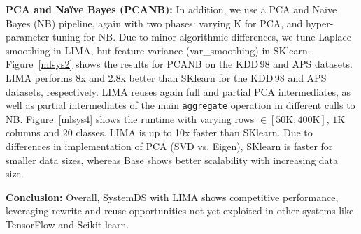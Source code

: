\textbf{PCA and Na\"ive Bayes (PCANB):} In addition, we use a PCA and Na\"ive Bayes (NB) pipeline, again with two phases: varying K for PCA, and hyper-parameter tuning for NB. Due to minor algorithmic differences, we tune Laplace smoothing in LIMA, but feature variance (var\_smoothing) in SKlearn. Figure~\ref{mlsys2} shows the results for PCANB on the KDD\,98 and APS datasets. LIMA performs 8x and 2.8x better than SKlearn for the KDD\,98 and APS datasets, respectively. LIMA reuses again full and partial PCA intermediates, as well as partial intermediates of the main \texttt{aggregate} operation in different calls to NB. Figure~\ref{mlsys4} shows the runtime with varying rows $\in [50\text{K}, 400\text{K}]$, $1\text{K}$ columns and 20 classes. LIMA is up to 10x faster than SKlearn. Due to differences in implementation of PCA (SVD vs. Eigen), SKlearn is faster for smaller data sizes, whereas Base shows better scalability with increasing data size.

\textbf{Conclusion:} Overall, SystemDS with LIMA shows competitive performance, leveraging rewrite and reuse opportunities not yet exploited in other systems like TensorFlow and Scikit-learn.
